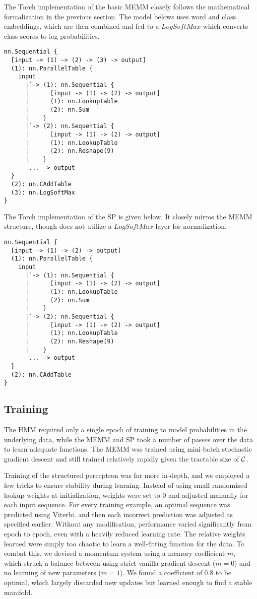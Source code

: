 \documentclass[11pt]{article}
\begin{document}
The Torch implementation of the basic MEMM closely follows the mathematical formalization in the previous section. The model belows uses word and class embeddings, which are then combined and fed to a $LogSoftMax$ which converts class scores to log probabilities.
\begin{verbatim}
nn.Sequential {
  [input -> (1) -> (2) -> (3) -> output]
  (1): nn.ParallelTable {
    input
      |`-> (1): nn.Sequential {
      |      [input -> (1) -> (2) -> output]
      |      (1): nn.LookupTable
      |      (2): nn.Sum
      |    }
      |`-> (2): nn.Sequential {
      |      [input -> (1) -> (2) -> output]
      |      (1): nn.LookupTable
      |      (2): nn.Reshape(9)
      |    }
       ... -> output
  }
  (2): nn.CAddTable
  (3): nn.LogSoftMax
}
\end{verbatim}

The Torch implementation of the SP is given below. It closely mirros the MEMM structure, though does not utilize a $LogSoftMax$ layer for normalization.
\begin{verbatim}
nn.Sequential {
  [input -> (1) -> (2) -> output]
  (1): nn.ParallelTable {
    input
      |`-> (1): nn.Sequential {
      |      [input -> (1) -> (2) -> output]
      |      (1): nn.LookupTable
      |      (2): nn.Sum
      |    }
      |`-> (2): nn.Sequential {
      |      [input -> (1) -> (2) -> output]
      |      (1): nn.LookupTable
      |      (2): nn.Reshape(9)
      |    }
       ... -> output
  }
  (2): nn.CAddTable
}
\end{verbatim}

\subsection{Training}
The HMM required only a single epoch of training to model probabilities in the underlying data, while the MEMM and SP took a number of passes over the data to learn adequate functions. The MEMM was trained using mini-batch stochastic gradient descent and still trained relatively rapidly given the tractable size of $\mathcal{C}$.

Training of the structured perceptron was far more in-depth, and we employed a few tricks to ensure stability during learning. Instead of using small randomized lookup weights at initialization, weights were set to 0 and adjusted manually for each input sequence. For every training example, an optimal sequence was predicted using Viterbi, and then each incorrect prediction was adjusted as specified earlier. Without any modification, performance varied significantly from epoch to epoch, even with a heavily reduced learning rate. The relative weights learned were simply too chaotic to learn a well-fitting function for the data. To combat this, we devised a momentum system using a memory coefficient $m$, which struck a balance between using strict vanilla gradient descent ($m=0$) and no learning of new parameters ($m=1$). We found a coefficient of 0.8 to be optimal, which largely discarded new updates but learned enough to find a stable manifold.
\end{document}
